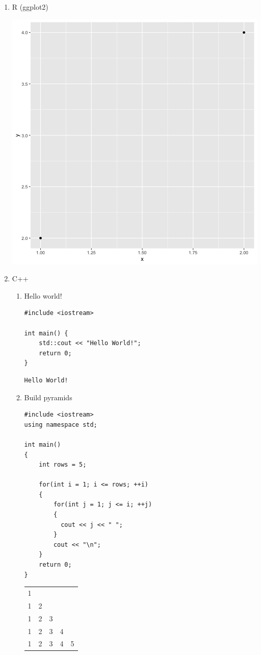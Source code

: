 \documentclass[11pt]{article}
\begin{document}
\begin{enumerate}
\item R (ggplot2)
\label{sec:orgd4a6ccf}

\begin{center}
\includegraphics[width=.9\linewidth]{foo.png}
\end{center}

\item C++
\label{sec:org4b0035e}

\begin{enumerate}
\item Hello world!
\label{sec:orga61c626}
\begin{verbatim}
#include <iostream>

int main() {
    std::cout << "Hello World!";
    return 0;
}
\end{verbatim}

\begin{verbatim}
Hello World!
\end{verbatim}


\item Build pyramids
\label{sec:orgd2418cc}
\begin{verbatim}
#include <iostream>
using namespace std;

int main()
{
    int rows = 5;

    for(int i = 1; i <= rows; ++i)
    {
        for(int j = 1; j <= i; ++j)
        {
          cout << j << " ";
        }
        cout << "\n";
    }
    return 0;
}
\end{verbatim}

\begin{center}
\begin{tabular}{rrrll}
1 &  &  &  & \\
1 & 2 &  &  & \\
1 & 2 & 3 &  & \\
1 & 2 & 3 & 4 & \\
1 & 2 & 3 & 4 & 5\\
\end{tabular}
\end{center}
\end{enumerate}
\end{enumerate}
\end{document}
